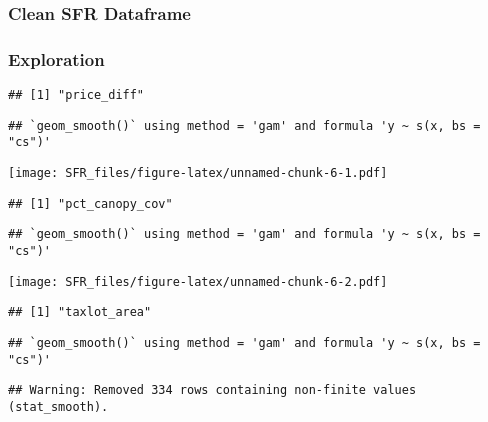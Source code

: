 \documentclass[]{article}
\newenvironment{Shaded}{\begin{snugshade}}{\end{snugshade}}
\newcommand{\KeywordTok}[1]{\textcolor[rgb]{0.13,0.29,0.53}{\textbf{#1}}}
\newcommand{\NormalTok}[1]{#1}
\newcommand{\OperatorTok}[1]{\textcolor[rgb]{0.81,0.36,0.00}{\textbf{#1}}}
\newcommand{\StringTok}[1]{\textcolor[rgb]{0.31,0.60,0.02}{#1}}
\begin{document}
\begin{Shaded}
\end{Shaded}

\hypertarget{clean-sfr-dataframe}{%
\subsubsection{Clean SFR Dataframe}\label{clean-sfr-dataframe}}

\hypertarget{exploration}{%
\subsubsection{Exploration}\label{exploration}}

\begin{verbatim}
## [1] "price_diff"
\end{verbatim}

\begin{verbatim}
## `geom_smooth()` using method = 'gam' and formula 'y ~ s(x, bs = "cs")'
\end{verbatim}

\texttt{[image: SFR\_files/figure-latex/unnamed-chunk-6-1.pdf]}

\begin{verbatim}
## [1] "pct_canopy_cov"
\end{verbatim}

\begin{verbatim}
## `geom_smooth()` using method = 'gam' and formula 'y ~ s(x, bs = "cs")'
\end{verbatim}

\texttt{[image: SFR\_files/figure-latex/unnamed-chunk-6-2.pdf]}

\begin{verbatim}
## [1] "taxlot_area"
\end{verbatim}

\begin{verbatim}
## `geom_smooth()` using method = 'gam' and formula 'y ~ s(x, bs = "cs")'
\end{verbatim}

\begin{verbatim}
## Warning: Removed 334 rows containing non-finite values (stat_smooth).
\end{verbatim}
\end{document}
